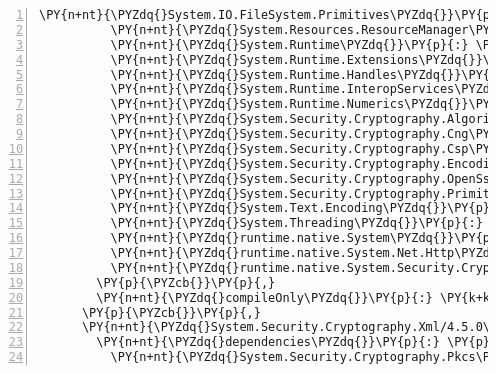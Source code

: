 \begin{Verbatim}[commandchars=\\\{\},numbers=left,firstnumber=1,stepnumber=1,numberblanklines=0]
          \PY{n+nt}{\PYZdq{}System.IO.FileSystem.Primitives\PYZdq{}}\PY{p}{:} \PY{l+s+s2}{\PYZdq{}4.3.0\PYZdq{}}\PY{p}{,}
          \PY{n+nt}{\PYZdq{}System.Resources.ResourceManager\PYZdq{}}\PY{p}{:} \PY{l+s+s2}{\PYZdq{}4.3.0\PYZdq{}}\PY{p}{,}
          \PY{n+nt}{\PYZdq{}System.Runtime\PYZdq{}}\PY{p}{:} \PY{l+s+s2}{\PYZdq{}4.3.0\PYZdq{}}\PY{p}{,}
          \PY{n+nt}{\PYZdq{}System.Runtime.Extensions\PYZdq{}}\PY{p}{:} \PY{l+s+s2}{\PYZdq{}4.3.0\PYZdq{}}\PY{p}{,}
          \PY{n+nt}{\PYZdq{}System.Runtime.Handles\PYZdq{}}\PY{p}{:} \PY{l+s+s2}{\PYZdq{}4.3.0\PYZdq{}}\PY{p}{,}
          \PY{n+nt}{\PYZdq{}System.Runtime.InteropServices\PYZdq{}}\PY{p}{:} \PY{l+s+s2}{\PYZdq{}4.3.0\PYZdq{}}\PY{p}{,}
          \PY{n+nt}{\PYZdq{}System.Runtime.Numerics\PYZdq{}}\PY{p}{:} \PY{l+s+s2}{\PYZdq{}4.3.0\PYZdq{}}\PY{p}{,}
          \PY{n+nt}{\PYZdq{}System.Security.Cryptography.Algorithms\PYZdq{}}\PY{p}{:} \PY{l+s+s2}{\PYZdq{}4.3.0\PYZdq{}}\PY{p}{,}
          \PY{n+nt}{\PYZdq{}System.Security.Cryptography.Cng\PYZdq{}}\PY{p}{:} \PY{l+s+s2}{\PYZdq{}4.5.0\PYZhy{}rc1\PYZdq{}}\PY{p}{,}
          \PY{n+nt}{\PYZdq{}System.Security.Cryptography.Csp\PYZdq{}}\PY{p}{:} \PY{l+s+s2}{\PYZdq{}4.3.0\PYZdq{}}\PY{p}{,}
          \PY{n+nt}{\PYZdq{}System.Security.Cryptography.Encoding\PYZdq{}}\PY{p}{:} \PY{l+s+s2}{\PYZdq{}4.3.0\PYZdq{}}\PY{p}{,}
          \PY{n+nt}{\PYZdq{}System.Security.Cryptography.OpenSsl\PYZdq{}}\PY{p}{:} \PY{l+s+s2}{\PYZdq{}4.3.0\PYZdq{}}\PY{p}{,}
          \PY{n+nt}{\PYZdq{}System.Security.Cryptography.Primitives\PYZdq{}}\PY{p}{:} \PY{l+s+s2}{\PYZdq{}4.3.0\PYZdq{}}\PY{p}{,}
          \PY{n+nt}{\PYZdq{}System.Text.Encoding\PYZdq{}}\PY{p}{:} \PY{l+s+s2}{\PYZdq{}4.3.0\PYZdq{}}\PY{p}{,}
          \PY{n+nt}{\PYZdq{}System.Threading\PYZdq{}}\PY{p}{:} \PY{l+s+s2}{\PYZdq{}4.3.0\PYZdq{}}\PY{p}{,}
          \PY{n+nt}{\PYZdq{}runtime.native.System\PYZdq{}}\PY{p}{:} \PY{l+s+s2}{\PYZdq{}4.3.0\PYZdq{}}\PY{p}{,}
          \PY{n+nt}{\PYZdq{}runtime.native.System.Net.Http\PYZdq{}}\PY{p}{:} \PY{l+s+s2}{\PYZdq{}4.3.0\PYZdq{}}\PY{p}{,}
          \PY{n+nt}{\PYZdq{}runtime.native.System.Security.Cryptography.OpenSsl\PYZdq{}}\PY{p}{:} \PY{l+s+s2}{\PYZdq{}4.3.0\PYZdq{}}
        \PY{p}{\PYZcb{}}\PY{p}{,}
        \PY{n+nt}{\PYZdq{}compileOnly\PYZdq{}}\PY{p}{:} \PY{k+kc}{true}
      \PY{p}{\PYZcb{}}\PY{p}{,}
      \PY{n+nt}{\PYZdq{}System.Security.Cryptography.Xml/4.5.0\PYZhy{}rc1\PYZdq{}}\PY{p}{:} \PY{p}{\PYZob{}}
        \PY{n+nt}{\PYZdq{}dependencies\PYZdq{}}\PY{p}{:} \PY{p}{\PYZob{}}
          \PY{n+nt}{\PYZdq{}System.Security.Cryptography.Pkcs\PYZdq{}}\PY{p}{:} \PY{l+s+s2}{\PYZdq{}4.5.0\PYZhy{}rc1\PYZdq{}}\PY{p}{,}

\end{Verbatim}
